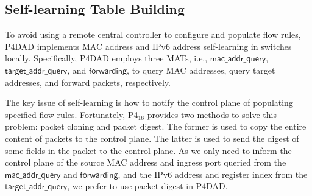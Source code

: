 \documentclass[journal]{IEEEtran}
\begin{document}
    \subsection{Self-learning Table Building}\label{sec:self-learning building}
        To avoid using a remote central controller to configure and populate flow rules, P4DAD implements MAC address and IPv6 address self-learning in switches locally. 
        Specifically, P4DAD employs three MATs, i.e., $\mathsf{mac\_addr\_query}$, $\mathsf{target\_addr\_query}$, and $\mathsf{forwarding}$, to query MAC addresses, query target addresses, and forward packets, respectively.

        The key issue of self-learning is how to notify the control plane of populating specified flow rules. Fortunately, P4$_{16}$ provides two methods to solve this problem: packet cloning and packet digest. The former is used to copy the entire content of packets to the control plane. The latter is used to send the digest of some fields in the packet to the control plane.
        As we only need to inform the control plane of the source MAC address and ingress port queried from the $\mathsf{mac\_addr\_query}$ and $\mathsf{forwarding}$, and the IPv6 address and register index from the $\mathsf{target\_addr\_query}$, we prefer to use packet digest in P4DAD.
\end{document}
